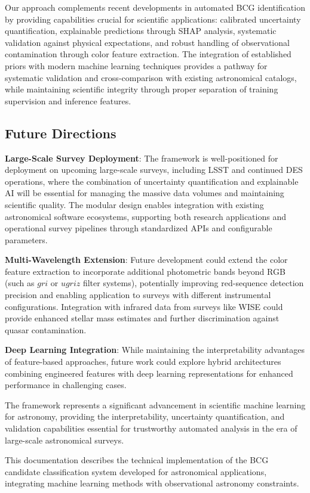 \documentclass[twocolumn,10pt]{aastex631}
\begin{document}
Our approach complements recent developments in automated BCG identification by providing capabilities crucial for scientific applications: calibrated uncertainty quantification, explainable predictions through SHAP analysis, systematic validation against physical expectations, and robust handling of observational contamination through color feature extraction. The integration of established priors \citep{Rykoff2014redMaPPer} with modern machine learning techniques provides a pathway for systematic validation and cross-comparison with existing astronomical catalogs, while maintaining scientific integrity through proper separation of training supervision and inference features.

\subsection{Future Directions}

\textbf{Large-Scale Survey Deployment}: The framework is well-positioned for deployment on upcoming large-scale surveys, including LSST and continued DES operations, where the combination of uncertainty quantification and explainable AI will be essential for managing the massive data volumes and maintaining scientific quality. The modular design enables integration with existing astronomical software ecosystems, supporting both research applications and operational survey pipelines through standardized APIs and configurable parameters.

\textbf{Multi-Wavelength Extension}: Future development could extend the color feature extraction to incorporate additional photometric bands beyond RGB (such as $gri$ or $ugriz$ filter systems), potentially improving red-sequence detection precision and enabling application to surveys with different instrumental configurations. Integration with infrared data from surveys like WISE could provide enhanced stellar mass estimates and further discrimination against quasar contamination.

\textbf{Deep Learning Integration}: While maintaining the interpretability advantages of feature-based approaches, future work could explore hybrid architectures combining engineered features with deep learning representations for enhanced performance in challenging cases.

The framework represents a significant advancement in scientific machine learning for astronomy, providing the interpretability, uncertainty quantification, and validation capabilities essential for trustworthy automated analysis in the era of large-scale astronomical surveys.

\begin{acknowledgments}
This documentation describes the technical implementation of the BCG candidate classification system developed for astronomical applications, integrating machine learning methods with observational astronomy constraints.
\end{acknowledgments}



\end{document}
